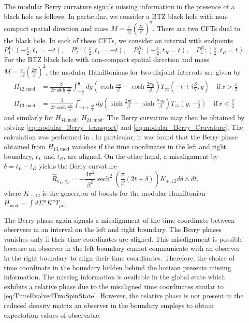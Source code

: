 \documentclass[a4paper,11pt]{article}
\newcommand{\1}{\mathds{1}}
\begin{document}
The modular Berry curvature signals missing information in the presence of a black hole as follows. In particular, we consider a BTZ black hole with non-compact spatial direction and mass $M=\frac{c}{12}\left(\frac{2 \pi}{\beta}\right)^2$. There are two CFTs dual to the black hole. In each of these CFTs, we consider an interval with endpoints
$P^L_1:\left(-\frac{x}{2}, t_L=-t\right), \quad P^L_2:\left(\frac{x}{2}, t_L=-t\right), \quad P^R_3:\left(-\frac{x}{2}, t_R=t\right), \quad P^R_4:\left(\frac{x}{2}, t_R=t\right)$.
For the BTZ black hole with non-compact spatial direction and mass $M=\frac{c}{12}\left(\frac{2 \pi}{\beta}\right)^2$, the modular Hamiltonians for two disjoint intervals are given by \cite{Nakagawa:2018kvo}
\begin{equation}
    \begin{aligned}
        H_{12,\mathrm{mod}}&=\frac{\beta}{2 \pi \sinh \frac{\pi x}{\beta}} \int_{-\frac{x}{2}}^{\frac{x}{2}} d y\left(\cosh \frac{\pi x}{\beta}-\cosh \frac{2 \pi y}{\beta}\right) T_{z z}\left(-t+i \frac{\beta}{2}, y\right) \quad\mathrm{if}\, x>\frac{t}{2}\\
        H_{13,\mathrm{mod}}&=\frac{\beta}{2 \pi \cosh \frac{2 \pi t}{\beta}} \int_{-t+\frac{i \beta}{2}}^t d y\left(\sinh \frac{2 \pi t}{\beta}-\sinh \frac{2 \pi y}{\beta}\right) T_{z z}\left(y,-\frac{x}{2}\right) \quad\mathrm{if}\, x<\frac{t}{2}
    \end{aligned}
\end{equation}
and similarly for $ H_{34,\mathrm{mod}}$, $ H_{24,\mathrm{mod}}$. The Berry curvature may then be obtained by solving \eqref{eq:modular_Berry_transport} and \eqref{eq:modular_Berry_Cruvature}. The calculation was performed in \cite{Banerjee:2022jnv}. In particular, it was found that the Berry phase obtained from $ H_{13,\mathrm{mod}}$ vanishes if the time coordinates in the left and right boundary, $t_L$ and $t_R$, are aligned. On the other hand, a misalignment by $\delta=t_L-t_R$ yields the Berry curvature \cite{Banerjee:2022jnv}
\begin{equation}
    \hat{R}_{u_L, u_R}=-\frac{4 \pi^2}{\beta^2} \operatorname{sech}^2\left(\frac{\pi}{\beta}(2 t+\delta)\right) K_{+,12} d \delta \wedge d t,
\end{equation}
where $K_{+,12}$ is the generator of boosts for the modular Hamiltonian $ H_{\mathrm{mod}}=\int d\Sigma^{\mu}K^{\nu}T_{\mu\nu}$.

The Berry phase again signals a misalignment of the time coordinate between observers in an interval on the left and right boundary. The Berry phases vanishes only if their time coordinates are aligned. This misalignment is possible because an observer in the left boundary cannot communicate with an observer in the right boundary to align their time coordinates. Therefore, the choice of time coordinate in the boundary hidden behind the horizon presents missing information. The missing information is available in the global state which exhibits a relative phase due to the misaligned time coordinates similar to \eqref{eq:TimeEvolvedTwoSpinState}. However, the relative phase is not present in the reduced density matrix an observer in the boundary employs to obtain expectation values of observable.
\end{document}
